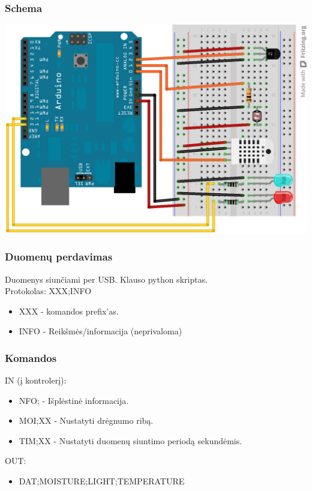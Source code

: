 \documentclass[12pt,a4paper]{beamer}
\begin{document}
\begin{frame}
    \frametitle{Schema}
    \begin{center}
        \includegraphics[scale=0.2]{img/schema.png}
    \end{center}
\end{frame}

\begin{frame}
    \frametitle{Duomenų perdavimas}

    Duomenys siunčiami per USB. Klauso python skriptas.\\
    \vskip1cm
    Protokolas: XXX;INFO

    \begin{itemize}
        \item XXX - komandos prefix'as.
        \item INFO - Reikšmės/informacija (neprivaloma)
    \end{itemize}
\end{frame}

\begin{frame}
    \frametitle{Komandos}
    
    IN (į kontrolerį):
    \begin{itemize}
        \item NFO; - Išplėstinė informacija.
        \item MOI;XX - Nustatyti drėgnumo ribą.
        \item TIM;XX - Nustatyti duomenų siuntimo periodą sekundėmis.
    \end{itemize}

    OUT:
    \begin{itemize}
        \item DAT;MOISTURE;LIGHT;TEMPERATURE
    \end{itemize}

\end{frame}
\end{document}
